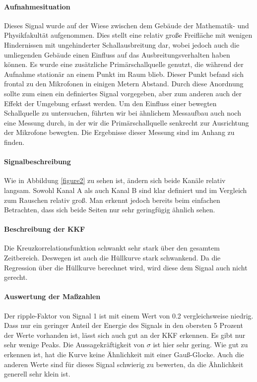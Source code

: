 \paragraph{Aufnahmesituation} Dieses Signal wurde auf der Wiese zwischen dem Gebäude der Mathematik- und Physikfakultät aufgenommen. Dies stellt eine relativ große Freifläche mit wenigen Hindernissen mit ungehinderter Schallausbreitung dar, wobei jedoch auch die umliegenden Gebäude einen Einfluss auf das Ausbreitungsverhalten haben können. Es wurde eine zusätzliche Primärschallquelle genutzt, die während der Aufnahme stationär an einem Punkt im Raum blieb. Dieser Punkt befand sich frontal zu den Mikrofonen in einigen Metern Abstand. Durch diese Anordnung sollte zum einen ein definiertes Signal vorgegeben, aber zum anderen auch der Effekt der Umgebung erfasst werden. 
Um den Einfluss einer bewegten Schallquelle zu untersuchen, führten wir bei ähnlichem Messaufbau auch noch eine Messung durch, in der wir die Primärschallquelle senkrecht zur Ausrichtung der Mikrofone bewegten. Die Ergebnisse dieser Messung sind im Anhang zu finden.
\paragraph{Signalbeschreibung} Wie in Abbildung \ref{figure2} zu sehen ist, ändern sich beide Kanäle relativ langsam. Sowohl Kanal A als auch Kanal B sind klar definiert und im Vergleich zum Rauschen relativ groß. Man erkennt jedoch bereits beim einfachen Betrachten, dass sich beide Seiten nur sehr geringfügig ähnlich sehen.
\paragraph{Beschreibung der KKF} Die Kreuzkorrelationsfunktion schwankt sehr stark über den gesamtem Zeitbereich. Deswegen ist auch die Hüllkurve stark schwankend. Da die Regression über die Hüllkurve berechnet wird, wird diese dem Signal auch nicht gerecht.
\paragraph{Auswertung der Maßzahlen}
Der ripple-Faktor von Signal 1 ist mit einem Wert von 0.2 vergleichsweise niedrig. Dass nur ein geringer Anteil der Energie des Signals in den obersten 5 Prozent der Werte vorhanden ist, lässt sich auch gut an der KKF erkennen. Es gibt nur sehr wenige Peaks. Die Aussagekräftigkeit von $\sigma$ ist hier sehr gering. Wie gut zu erkennen ist, hat die Kurve keine Ähnlichkeit mit einer Gauß-Glocke. Auch die anderen Werte sind für dieses Signal schwierig zu bewerten, da die Ähnlichkeit generell sehr klein ist.
